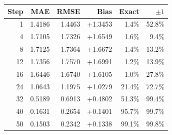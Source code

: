 \begin{tabular}{rrrrrr}
\hline
Step & MAE & RMSE & Bias & Exact & $\pm1$ \\
\hline
1 & 1.4186 & 1.4463 & +1.3453 & 1.4\% & 52.8\% \\
4 & 1.7105 & 1.7326 & +1.6549 & 1.6\% & 9.4\% \\
8 & 1.7125 & 1.7364 & +1.6672 & 1.4\% & 13.2\% \\
12 & 1.7356 & 1.7570 & +1.6991 & 1.2\% & 13.9\% \\
16 & 1.6446 & 1.6740 & +1.6105 & 1.0\% & 27.8\% \\
24 & 1.0643 & 1.1975 & +1.0279 & 21.4\% & 72.7\% \\
32 & 0.5189 & 0.6913 & +0.4802 & 51.3\% & 99.4\% \\
40 & 0.1631 & 0.2654 & +0.1401 & 95.7\% & 99.7\% \\
50 & 0.1503 & 0.2342 & +0.1338 & 99.1\% & 99.8\% \\
\hline
\end{tabular}
